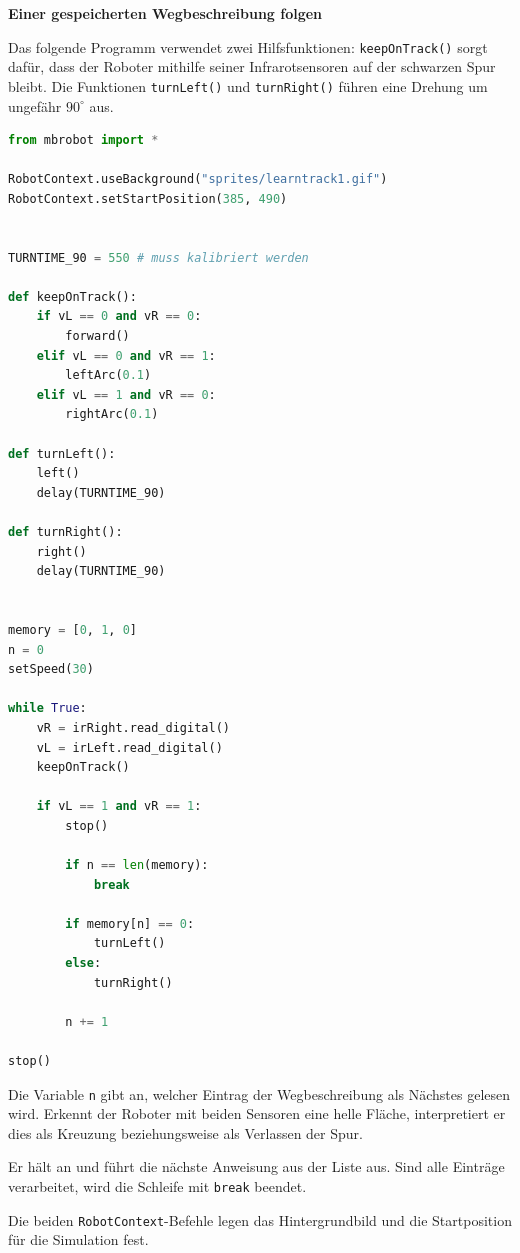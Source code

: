 \begin{myexample}
    \textbf{Einer gespeicherten Wegbeschreibung folgen}

    Das folgende Programm verwendet zwei Hilfsfunktionen:
    \texttt{keepOnTrack()} sorgt dafür, dass der Roboter
    mithilfe seiner Infrarotsensoren auf der schwarzen
    Spur bleibt. Die Funktionen \texttt{turnLeft()} und
    \texttt{turnRight()} führen eine Drehung um ungefähr
    \(90^\circ\) aus.

    \begin{lstlisting}[language=Python]
from mbrobot import *

RobotContext.useBackground("sprites/learntrack1.gif")
RobotContext.setStartPosition(385, 490)


TURNTIME_90 = 550 # muss kalibriert werden

def keepOnTrack():
    if vL == 0 and vR == 0:
        forward()
    elif vL == 0 and vR == 1:
        leftArc(0.1)
    elif vL == 1 and vR == 0:
        rightArc(0.1)

def turnLeft():
    left()
    delay(TURNTIME_90)

def turnRight():
    right()
    delay(TURNTIME_90)


memory = [0, 1, 0]
n = 0
setSpeed(30)

while True:
    vR = irRight.read_digital()
    vL = irLeft.read_digital()
    keepOnTrack()

    if vL == 1 and vR == 1:
        stop()

        if n == len(memory):
            break

        if memory[n] == 0:
            turnLeft()
        else:
            turnRight()

        n += 1

stop()
    \end{lstlisting}

    Die Variable \texttt{n} gibt an, welcher Eintrag
    der Wegbeschreibung als Nächstes gelesen wird.
    Erkennt der Roboter mit beiden Sensoren eine
    helle Fläche, interpretiert er dies als Kreuzung
    beziehungsweise als Verlassen der Spur.

    Er hält an und führt die nächste Anweisung aus
    der Liste aus. Sind alle Einträge verarbeitet,
    wird die Schleife mit \texttt{break} beendet.

    Die beiden \texttt{RobotContext}-Befehle legen
    das Hintergrundbild und die Startposition
    für die Simulation fest.
\end{myexample}


